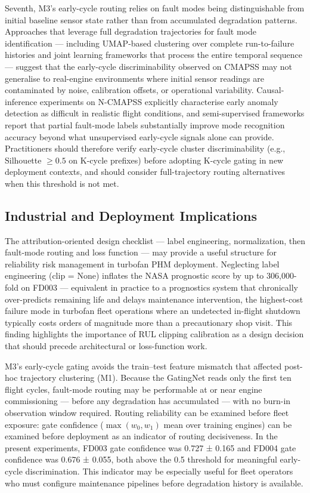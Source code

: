 \documentclass[preprint,10pt]{elsarticle}
\begin{document}
Seventh, M3's early-cycle routing relies on fault modes being distinguishable from initial baseline sensor state rather than from accumulated degradation patterns. Approaches that leverage full degradation trajectories for fault mode identification \cite{ref46,ref47} — including UMAP-based clustering over complete run-to-failure histories and joint learning frameworks that process the entire temporal sequence — suggest that the early-cycle discriminability observed on CMAPSS may not generalise to real-engine environments where initial sensor readings are contaminated by noise, calibration offsets, or operational variability. Causal-inference experiments on N-CMAPSS \cite{ref48} explicitly characterise early anomaly detection as difficult in realistic flight conditions, and semi-supervised frameworks \cite{ref49} report that partial fault-mode labels substantially improve mode recognition accuracy beyond what unsupervised early-cycle signals alone can provide. Practitioners should therefore verify early-cycle cluster discriminability (e.g., Silhouette $\geq 0.5$ on K-cycle prefixes) before adopting K-cycle gating in new deployment contexts, and should consider full-trajectory routing alternatives when this threshold is not met.

\subsection{Industrial and Deployment Implications}

The attribution-oriented design checklist — label engineering, normalization, then fault-mode routing and loss function — may provide a useful structure for reliability risk management in turbofan PHM deployment. Neglecting label engineering (clip = None) inflates the NASA prognostic score by up to 306,000-fold on FD003 — equivalent in practice to a prognostics system that chronically over-predicts remaining life and delays maintenance intervention, the highest-cost failure mode in turbofan fleet operations where an undetected in-flight shutdown typically costs orders of magnitude more than a precautionary shop visit. This finding highlights the importance of RUL clipping calibration as a design decision that should precede architectural or loss-function work.

M3's early-cycle gating avoids the train--test feature mismatch that affected post-hoc trajectory clustering (M1). Because the GatingNet reads only the first ten flight cycles, fault-mode routing may be performable at or near engine commissioning --- before any degradation has accumulated --- with no burn-in observation window required. Routing reliability can be examined before fleet exposure: gate confidence ($\max(w_0, w_1)$ mean over training engines) can be examined before deployment as an indicator of routing decisiveness. In the present experiments, FD003 gate confidence was 0.727 ± 0.165 and FD004 gate confidence was 0.676 ± 0.055, both above the 0.5 threshold for meaningful early-cycle discrimination. This indicator may be especially useful for fleet operators who must configure maintenance pipelines before degradation history is available.
\end{document}
